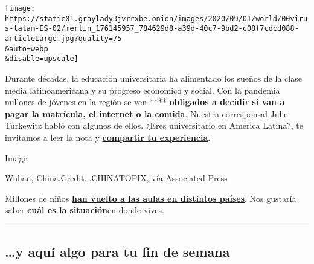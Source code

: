 \texttt{[image: https://static01.graylady3jvrrxbe.onion/images/2020/09/01/world/00virus-latam-ES-02/merlin\_176145957\_784629d8-a39d-40c7-9bd2-c08f7cdcd088-articleLarge.jpg?quality=75\\\&auto=webp\\\&disable=upscale]}

Durante décadas, la educación universitaria ha alimentado los sueños de
la clase media latinoamericana y su progreso económico y social. Con la
pandemia millones de jóvenes en la región se ven ****
\textbf{\href{http://nytimes3xbfgragh.onion/es/2020/09/04/espanol/america-latina/crisis-universidades-coronavirus.html}{obligados
a decidir si van a pagar la matrícula, el internet o la comida}}.
Nuestra corresponsal Julie Turkewitz habló con algunos de ellos. ¿Eres
universitario en América Latina?, te invitamos a leer la nota y
\textbf{\href{http://nytimes3xbfgragh.onion/es/2020/09/04/espanol/america-latina/crisis-universidades-coronavirus.html\#commentsContainer}{compartir
tu experiencia}.}

Image

Wuhan, China.Credit...CHINATOPIX, vía Associated Press

Millones de niños
\textbf{\href{https://www.nytimes3xbfgragh.onion/es/2020/09/01/espanol/mundo/vuelta-a-clases-coronavirus.html}{han
vuelto a las aulas en distintos países}}. Nos gustaría saber
\textbf{\href{https://www.nytimes3xbfgragh.onion/es/2020/09/01/espanol/mundo/vuelta-a-clases-coronavirus.html\#commentsContainer}{cuál
es la
situación}}\href{https://www.nytimes3xbfgragh.onion/es/2020/09/01/espanol/mundo/vuelta-a-clases-coronavirus.html\#commentsContainer}{}en
donde vives.

\begin{center}\rule{0.5\linewidth}{\linethickness}\end{center}

\hypertarget{y-aquuxed-algo-para-tu-fin-de-semana}{%
\subsection{\ldots{}y aquí algo para tu fin de
semana}\label{y-aquuxed-algo-para-tu-fin-de-semana}}

